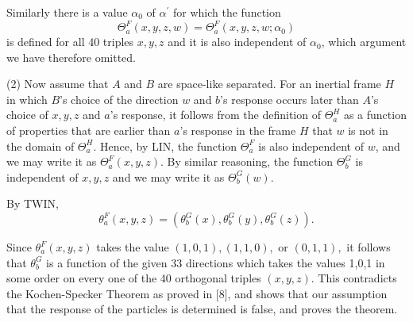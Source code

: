 \documentclass{article}
\begin{document}
Similarly there is a value $\alpha_0$ of $\alpha^\prime$ for which the function \[\Theta^F_a(x,y,z,w) = \Theta^F_a(x,y,z,w;\alpha_0)\] is defined for all 40 triples $x,y,z$ and it is also independent of $\alpha_0$, which argument we have therefore omitted.

(2) Now assume that $A$ and $B$ are space-like separated.  For an inertial frame $H$ in which $B$'s choice of the direction $w$ and $b$'s response occurs later than $A$'s choice of $x,y,z$ and $a$'s response, it follows from the definition of $\Theta_a^H$ as a function of properties that are earlier than $a$'s response in the frame $H$ that $w$ is not in the domain of $\Theta_a^H.$ Hence, by LIN, the function $\Theta_a^F$ is also independent of $w$, and we may write it as $\Theta_a^F(x,y,z).$ By similar reasoning, the function $\Theta_b^G$ is independent of $x,y,z$ and we may write it as $\Theta_b^G(w).$


By TWIN,                                              \[\theta_a^F(x,y,z)  =  (\theta_b^G(x), \theta_b^G(y), \theta_b^G(z)).\]                                                                                                                                                              

 Since $\theta_a^F(x,y,z)$ takes the value $(1,0,1), (1,1,0),$ or $(0,1,1),$ it follows that $\theta_b^G$ is a function of the given 33 directions which takes the values 1,0,1 in some order on every one of the 40 orthogonal triples $(x,y,z).$ This contradicts the Kochen-Specker Theorem as proved in [8], and shows that our assumption that the response of the particles is determined is false, and proves the theorem.


\newpage


\end{document}
